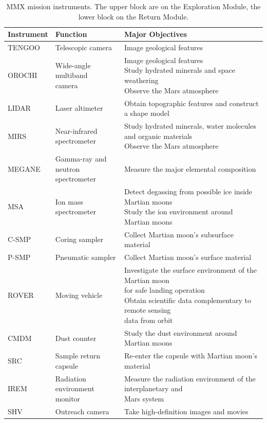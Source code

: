 \begin{table}[hbt!]
	\caption{MMX mission instruments. The upper block are on the Exploration Module, the lower block on the Return Module.}
	\label{table:instruments}
	\footnotesize
	\centering %
	\renewcommand{\cellalign}{tl}
	\renewcommand\cellgape{\Gape[5pt]}
	
	\begin{tabular}{|l|l|l|}
		\hline
		\textbf{Instrument} & \textbf{Function} & \textbf{Major Objectives} \\
		\hline
		TENGOO & Telescopic camera & Image geological features \\
		OROCHI & \makecell{Wide-angle multiband \\camera} & \makecell{Image geological features\\ Study hydrated minerals and space weathering \\  Observe the Mars atmosphere } \\
		LIDAR & Laser altimeter & Obtain topographic features and construct a shape model \\
		MIRS & \makecell{Near-infrared\\ spectrometer} & \makecell{Study hydrated minerals, water molecules and organic materials \\ Observe the Mars atmosphere} \\
		MEGANE & \makecell{Gamma-ray and neutron \\spectrometer} & Measure the major elemental composition \\
		MSA & Ion mass spectrometer &  \makecell{Detect degassing from possible ice inside Martian moons \\ Study the ion environment around Martian moons} \\
		C-SMP & Coring sampler & Collect Martian moon's subsurface material\\
		P-SMP & Pneumatic sampler & Collect Martian moon's surface material \\
		ROVER & Moving vehicle & \makecell{Investigate the surface environment of the Martian moon \\ \hspace{3mm} for safe landing operation \\ Obtain scientific data complementary to remote sensing \\ \hspace{3mm} data from orbit} \\
		\hline
		CMDM & Dust counter &  Study the dust environment around Martian moons \\
		SRC & Sample return capsule &  Re-enter the capsule with Martian moon's material \\
		IREM & \makecell{Radiation environment \\monitor} & \makecell{ Measure the radiation environment of the interplanetary and \\ \hspace{3mm} Mars system} \\
		SHV & Outreach camera & Take high-definition images and movies \\
		\hline
	\end{tabular}
\end{table}

